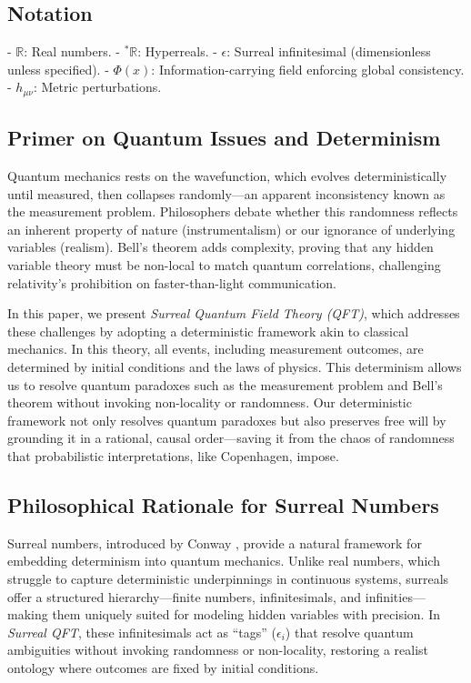 \documentclass{article}
\begin{document}
\subsection*{Notation}
- \(\mathbb{R}\): Real numbers.
- \({}^*\mathbb{R}\): Hyperreals.
- \(\epsilon\): Surreal infinitesimal (dimensionless unless specified).
- \(\Phi(x)\): Information-carrying field enforcing global consistency.
- \(h_{\mu\nu}\): Metric perturbations.

\subsection{Primer on Quantum Issues and Determinism}
Quantum mechanics rests on the wavefunction, which evolves deterministically until measured, then collapses randomly---an apparent inconsistency known as the measurement problem. Philosophers debate whether this randomness reflects an inherent property of nature (instrumentalism) or our ignorance of underlying variables (realism). Bell's theorem adds complexity, proving that any hidden variable theory must be non-local to match quantum correlations, challenging relativity's prohibition on faster-than-light communication.

In this paper, we present \textit{Surreal Quantum Field Theory (QFT)}, which addresses these challenges by adopting a deterministic framework akin to classical mechanics. In this theory, all events, including measurement outcomes, are determined by initial conditions and the laws of physics. This determinism allows us to resolve quantum paradoxes such as the measurement problem and Bell's theorem without invoking non-locality or randomness. Our deterministic framework not only resolves quantum paradoxes but also preserves free will by grounding it in a rational, causal order---saving it from the chaos of randomness that probabilistic interpretations, like Copenhagen, impose.

\subsection{Philosophical Rationale for Surreal Numbers}
Surreal numbers, introduced by Conway \cite{Conway1976}, provide a natural framework for embedding determinism into quantum mechanics. Unlike real numbers, which struggle to capture deterministic underpinnings in continuous systems, surreals offer a structured hierarchy---finite numbers, infinitesimals, and infinities---making them uniquely suited for modeling hidden variables with precision. In \textit{Surreal QFT}, these infinitesimals act as ``tags'' (\(\epsilon_i\)) that resolve quantum ambiguities without invoking randomness or non-locality, restoring a realist ontology where outcomes are fixed by initial conditions.
\end{document}
